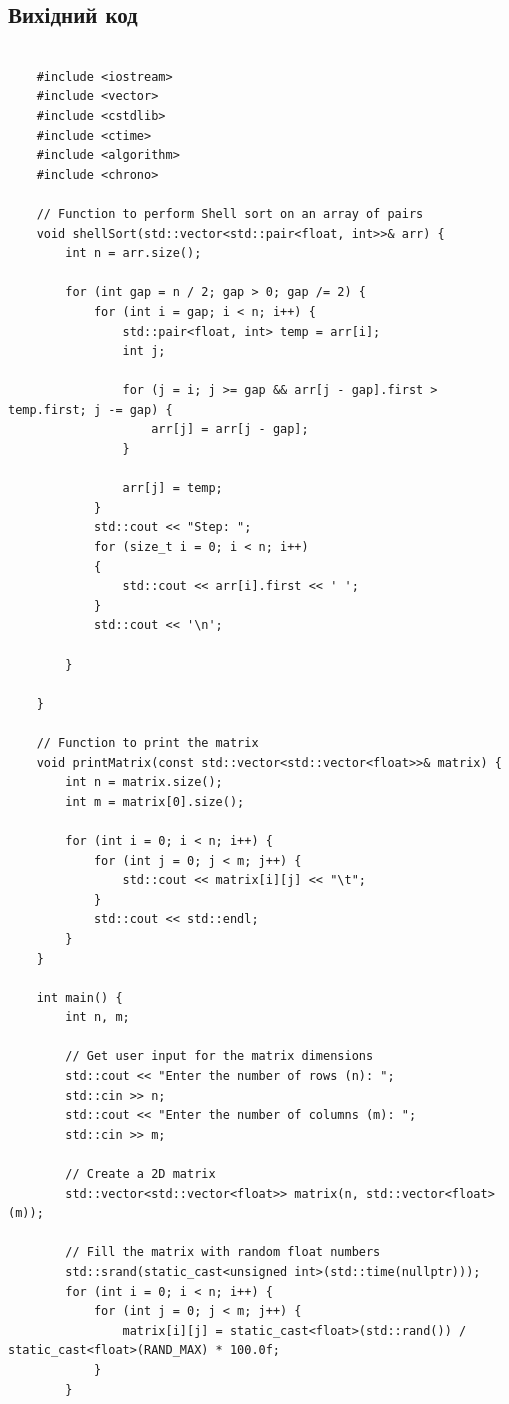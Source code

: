 \documentclass[12pt]{extarticle}
\begin{document}
\subsection*{Вихідний код}

{\selectfont

\begin{verbatim}
    
    #include <iostream>
    #include <vector>
    #include <cstdlib>
    #include <ctime>
    #include <algorithm>
    #include <chrono>
    
    // Function to perform Shell sort on an array of pairs
    void shellSort(std::vector<std::pair<float, int>>& arr) {
        int n = arr.size();
    
        for (int gap = n / 2; gap > 0; gap /= 2) {
            for (int i = gap; i < n; i++) {
                std::pair<float, int> temp = arr[i];
                int j;
    
                for (j = i; j >= gap && arr[j - gap].first > temp.first; j -= gap) {
                    arr[j] = arr[j - gap];
                }
    
                arr[j] = temp;
            }
            std::cout << "Step: ";
            for (size_t i = 0; i < n; i++)
            {
                std::cout << arr[i].first << ' ';
            }
            std::cout << '\n';
            
        }
    
    }
    
    // Function to print the matrix
    void printMatrix(const std::vector<std::vector<float>>& matrix) {
        int n = matrix.size();
        int m = matrix[0].size();
    
        for (int i = 0; i < n; i++) {
            for (int j = 0; j < m; j++) {
                std::cout << matrix[i][j] << "\t";
            }
            std::cout << std::endl;
        }
    }
    
    int main() {
        int n, m;
    
        // Get user input for the matrix dimensions
        std::cout << "Enter the number of rows (n): ";
        std::cin >> n;
        std::cout << "Enter the number of columns (m): ";
        std::cin >> m;
    
        // Create a 2D matrix
        std::vector<std::vector<float>> matrix(n, std::vector<float>(m));
    
        // Fill the matrix with random float numbers
        std::srand(static_cast<unsigned int>(std::time(nullptr)));
        for (int i = 0; i < n; i++) {
            for (int j = 0; j < m; j++) {
                matrix[i][j] = static_cast<float>(std::rand()) / static_cast<float>(RAND_MAX) * 100.0f;
            }
        }
    

\end{verbatim}}
\end{document}
